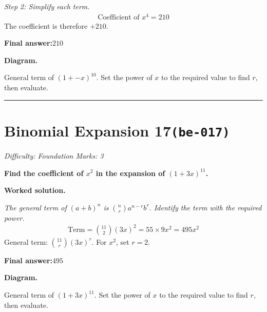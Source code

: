 \documentclass[11pt]{article}
\newcommand{\question}[1]{\par\medskip\noindent\textbf{#1}\par}
\begin{document}
\textit{Step 2: Simplify each term.}
\[\begin{gathered}
\text{Coefficient of } x^4 = 210
\end{gathered}\]
The coefficient is therefore \(+210\).

\begin{answerbox}
\textbf{Final answer:}\quad \(\displaystyle 210\)
\end{answerbox}
\textbf{Diagram.}

\begin{center}
\end{center}
\small General term of $\left(1+-x\right)^{10}$. Set the power of $x$ to the required value to find $r$, then evaluate.\normalsize

\medskip\hrule

\section*{Binomial Expansion 17\quad\small\texttt{(be-017)}}
\textit{Difficulty: Foundation \quad\textbar\quad Marks: 3}

\question{Find the coefficient of \( x^2 \) in the expansion of \( (1 + 3x)^{11} \).}

\textbf{Worked solution.}

\textit{The general term of \((a+b)^n\) is \(\binom{n}{r} a^{n-r} b^r\). Identify the term with the required power.}
\[\begin{gathered}
\text{Term} = \binom{11}{2}(3x)^2 = 55 \times 9x^2 = 495x^2
\end{gathered}\]
General term: \( \binom{11}{r}(3x)^r \). For \(x^2\), set \(r = 2\).

\begin{answerbox}
\textbf{Final answer:}\quad \(\displaystyle 495\)
\end{answerbox}
\textbf{Diagram.}

\begin{center}
\end{center}
\small General term of $\left(1+3x\right)^{11}$. Set the power of $x$ to the required value to find $r$, then evaluate.\normalsize
\end{document}

